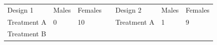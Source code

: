 \documentclass[]{book}
\theoremstyle{definition}
\theoremstyle{definition}
\theoremstyle{remark}
\begin{document}
\begin{longtable}[]{@{}lllllll@{}}
\toprule
\begin{minipage}[t]{0.13\columnwidth}\raggedright\strut
Design 1\strut
\end{minipage} & \begin{minipage}[t]{0.08\columnwidth}\raggedright\strut
Males\strut
\end{minipage} & \begin{minipage}[t]{0.09\columnwidth}\raggedright\strut
Females\strut
\end{minipage} & \begin{minipage}[t]{0.22\columnwidth}\raggedright\strut
\strut
\end{minipage} & \begin{minipage}[t]{0.13\columnwidth}\raggedright\strut
Design 2\strut
\end{minipage} & \begin{minipage}[t]{0.07\columnwidth}\raggedright\strut
Males\strut
\end{minipage} & \begin{minipage}[t]{0.09\columnwidth}\raggedright\strut
Females\strut
\end{minipage}\tabularnewline
\begin{minipage}[t]{0.13\columnwidth}\raggedright\strut
Treatment A\strut
\end{minipage} & \begin{minipage}[t]{0.08\columnwidth}\raggedright\strut
0\strut
\end{minipage} & \begin{minipage}[t]{0.09\columnwidth}\raggedright\strut
10\strut
\end{minipage} & \begin{minipage}[t]{0.22\columnwidth}\raggedright\strut
\strut
\end{minipage} & \begin{minipage}[t]{0.13\columnwidth}\raggedright\strut
Treatment A\strut
\end{minipage} & \begin{minipage}[t]{0.07\columnwidth}\raggedright\strut
1\strut
\end{minipage} & \begin{minipage}[t]{0.09\columnwidth}\raggedright\strut
9\strut
\end{minipage}\tabularnewline
\begin{minipage}[t]{0.13\columnwidth}\raggedright\strut
Treatment B\strut
\end{minipage} & \begin{minipage}[t]{0.08\columnwidth}\raggedright\strut

\end{minipage}
\end{longtable}
\end{document}
